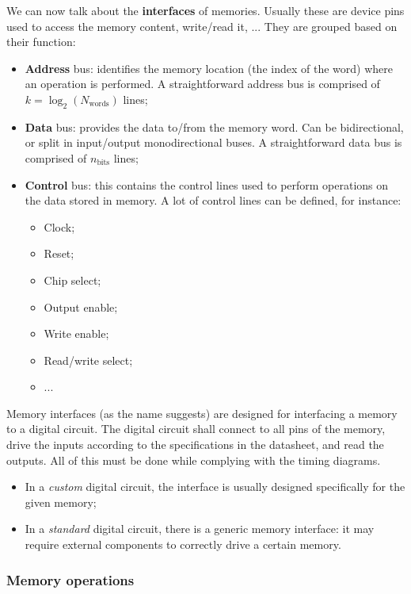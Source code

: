 \documentclass[a4paper,11pt]{article}
\begin{document}
We can now talk about the \textbf{interfaces} of memories.
Usually these are device pins used to access the memory content, write/read it, ...
They are grouped based on their function:
\begin{itemize}
	\item \textbf{Address} bus: identifies the memory location (the index of the word) where an operation is performed. A straightforward address bus is comprised of $k = \log_2(N_\text{words})$ lines;
	\item \textbf{Data} bus: provides the data to/from the memory word. Can be bidirectional, or split in input/output monodirectional buses. A straightforward data bus is comprised of $n_\text{bits}$ lines;
	\item \textbf{Control} bus: this contains the control lines used to perform operations on the data stored in memory. A lot of control lines can be defined, for instance:
	      \begin{itemize}
		      \item Clock; \item Reset; \item Chip select; \item Output enable; \item Write enable; \item Read/write select; \item ...
	      \end{itemize}
\end{itemize}

Memory interfaces (as the name suggests) are designed for interfacing a memory to a digital circuit.
The digital circuit shall connect to all pins of the memory, drive the inputs according to the specifications in the datasheet, and read the outputs.
All of this must be done while complying with the timing diagrams.

\begin{itemize}
	\item In a \textit{custom} digital circuit, the interface is usually designed specifically for the given memory;
	\item In a \textit{standard} digital circuit, there is a generic memory interface: it may require external components to correctly drive a certain memory.
\end{itemize}

\subsubsection{Memory operations}
\end{document}
